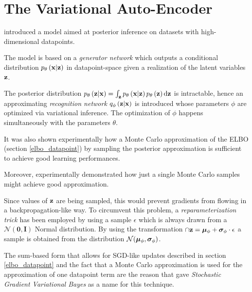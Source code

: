 \section{The Variational Auto-Encoder}

\cite{1312.6114} introduced a model aimed at posterior inference 
on datasets with high-dimensional datapoints.

The model is based on a \emph{generator network} which outputs a conditional
distribution $p_\theta\left(\mathbf{x}|\mathbf{z}\right)$ 
in datapoint-space given a realization of the latent variables $\mathbf{z}$.

The posterior distribution $p_\theta\left(\mathbf{z}|\mathbf{x}\right)=\int_{\mathbf{z}} p_\theta\left(\mathbf{x}|\mathbf{z}\right) p_\theta\left(\mathbf{z}\right) \mathrm{d}\mathbf{z}$ is intractable,
hence an approximating \emph{recognition network}
$q_\phi\left(\mathbf{z}|\mathbf{x}\right)$ is introduced whose parameters $\phi$ are 
optimized via variational inference. 
The optimization of $\phi$ happens simultaneously with the parameters $\theta$.

It was also shown experimentally how a Monte Carlo approximation of
the ELBO (section \ref{elbo_datapoint})
by sampling the posterior approximation is sufficient to
achieve good learning performances.

Moreover, \cite{1312.6114} experimentally demonstrated how just a single Monte Carlo samples might achieve good approximation.

Since values of $\mathbf{z}$ are being sampled, this would prevent gradients from flowing
in a backpropagation-like way. To circumvent this problem, a \emph{reparameterization trick}
has been employed by using a sample $\epsilon$ which is always drawn from
a $\mathcal{N}(\mathbf{0},\mathbf{I})$ Normal distribution.
By using the transformation $\cap{\mathbf{z}} = \boldsymbol\mu_{\phi} + \boldsymbol\sigma_{\phi} \cdot \epsilon$
a sample is obtained from the distribution $\mathcal{N}(\boldsymbol\mu_{\phi},\boldsymbol\sigma_{\phi})$.

The sum-based form that allows for SGD-like updates described in section
\ref{elbo_datapoint}
and
the fact that a Monte Carlo approximation is used for the approximation of one datapoint term
are the reason that \cite{1312.6114}
gave \emph{Stochastic Gradient Variational Bayes} as a name for this technique.
